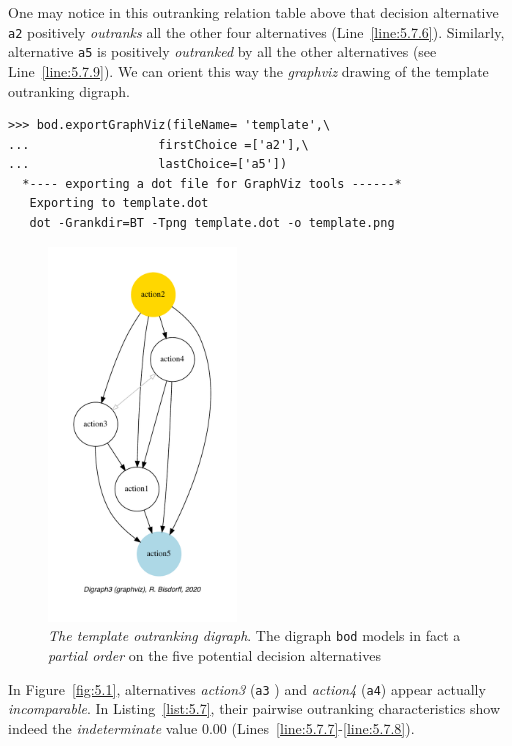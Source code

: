 One may notice in this outranking relation table above that decision alternative \texttt{a2} positively \emph{outranks} all the other four alternatives  (Line~\ref{line:5.7.6}). Similarly, alternative \texttt{a5} is positively \emph{outranked} by all the other alternatives (see Line~\ref{line:5.7.9}). We can orient this way the \emph{graphviz} drawing of the template outranking digraph. 
\begin{lstlisting}
>>> bod.exportGraphViz(fileName= 'template',\
...                  firstChoice =['a2'],\
...                  lastChoice=['a5'])
  *---- exporting a dot file for GraphViz tools ------*
   Exporting to template.dot
   dot -Grankdir=BT -Tpng template.dot -o template.png
\end{lstlisting}
\begin{figure}[ht]
\sidecaption[t]
\includegraphics[width=5cm]{Figures/5-1-template.pdf}
\caption[The template outranking digraph]{\emph{The template outranking digraph}. The digraph \texttt{bod} models in fact a \emph{partial order} on the five potential decision alternatives}
\label{fig:5.1}       %
\end{figure}

In Figure~\vref{fig:5.1}, alternatives \emph{action3} (\texttt{a3} ) and \emph{action4} (\texttt{a4}) appear actually \emph{incomparable}. In Listing~\vref{list:5.7}, their pairwise outranking characteristics show indeed the \emph{indeterminate} value $0.00$ (Lines~\ref{line:5.7.7}-\ref{line:5.7.8}).

